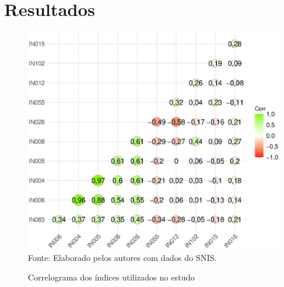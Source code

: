 


\section{Resultados}\label{s4}




\begin{figure}[H]
        \centering
        	\begin{minipage}{0.55\textwidth}	
                \caption{Correlograma dos índices utilizados no estudo}
                \label{f:corr}
                \includegraphics[scale=0.5]{corr.eps}                 
            	\footnotesize \\
            		Fonte: Elaborado pelos autores com dados do SNIS.    	
	\end{minipage}
\end{figure}














